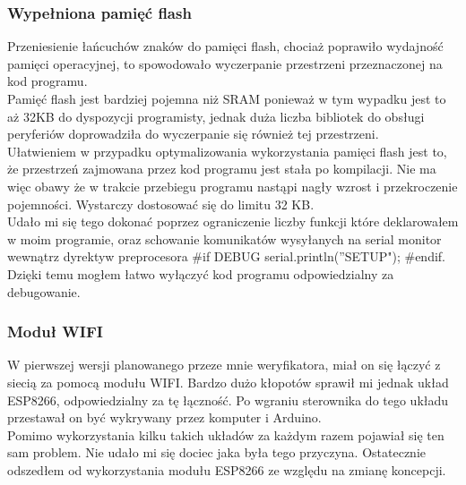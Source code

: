 \documentclass[declaration,shortabstract, mgr]{iithesis}
\begin{document}
\subsubsection{Wypełniona pamięć flash}
\indent Przeniesienie łańcuchów znaków do pamięci flash, chociaż poprawiło wydajność pamięci operacyjnej, to spowodowało wyczerpanie przestrzeni przeznaczonej na kod programu. \\
\indent Pamięć flash jest bardziej pojemna niż SRAM ponieważ w tym wypadku jest to aż 32KB do dyspozycji programisty, jednak duża liczba bibliotek do obsługi peryferiów doprowadziła do wyczerpanie się również tej przestrzeni. \\
\indent Ułatwieniem w przypadku optymalizowania wykorzystania pamięci flash jest to, że przestrzeń zajmowana przez kod programu jest stała po kompilacji. Nie ma więc obawy że w trakcie przebiegu programu nastąpi nagły wzrost i przekroczenie pojemności. Wystarczy dostosować się do limitu 32 KB. \\
\indent Udało mi się tego dokonać poprzez ograniczenie liczby funkcji które deklarowałem w moim programie, oraz schowanie komunikatów wysyłanych na serial monitor wewnątrz dyrektyw preprocesora \#if DEBUG serial.println(''SETUP"); \#endif. Dzięki temu mogłem łatwo wyłączyć kod programu odpowiedzialny za debugowanie.\\
\subsubsection{Moduł WIFI}
\indent W pierwszej wersji planowanego przeze mnie weryfikatora, miał on się łączyć z siecią za pomocą modułu WIFI. Bardzo dużo kłopotów sprawił mi jednak układ ESP8266, odpowiedzialny za tę łączność. Po wgraniu sterownika do tego układu przestawał on być wykrywany przez komputer i Arduino.\\ 
\indent Pomimo wykorzystania kilku takich układów za każdym razem pojawiał się ten sam problem. Nie udało mi się dociec jaka była tego przyczyna. Ostatecznie odszedłem od wykorzystania modułu ESP8266 ze względu na zmianę koncepcji.
\end{document}

